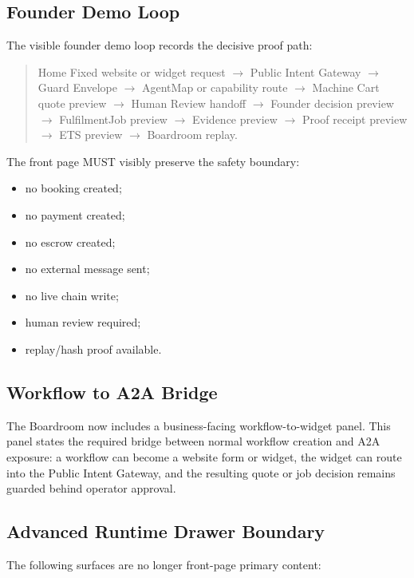 \subsection{Founder Demo Loop}

The visible founder demo loop records the decisive proof path:

\begin{quote}
Home Fixed website or widget request
$\rightarrow$ Public Intent Gateway
$\rightarrow$ Guard Envelope
$\rightarrow$ AgentMap or capability route
$\rightarrow$ Machine Cart quote preview
$\rightarrow$ Human Review handoff
$\rightarrow$ Founder decision preview
$\rightarrow$ FulfilmentJob preview
$\rightarrow$ Evidence preview
$\rightarrow$ Proof receipt preview
$\rightarrow$ ETS preview
$\rightarrow$ Boardroom replay.
\end{quote}

The front page MUST visibly preserve the safety boundary:

\begin{itemize}
  \item no booking created;
  \item no payment created;
  \item no escrow created;
  \item no external message sent;
  \item no live chain write;
  \item human review required;
  \item replay/hash proof available.
\end{itemize}

\subsection{Workflow to A2A Bridge}

The Boardroom now includes a business-facing workflow-to-widget panel. This panel
states the required bridge between normal workflow creation and A2A exposure:
a workflow can become a website form or widget, the widget can route into the
Public Intent Gateway, and the resulting quote or job decision remains guarded
behind operator approval.

\subsection{Advanced Runtime Drawer Boundary}

The following surfaces are no longer front-page primary content:

